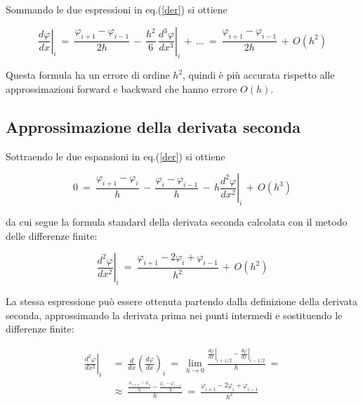 Sommando le due espressioni in eq.(\ref{der}) si ottiene

\[
\left.\frac{d\varphi}{dx}\right|_i
\ =\
\frac{\varphi_{i+1}-\varphi_{i-1}}{2h}\,
-\,
\frac{h^2}{6}\,
\left.\frac{d^3\varphi}{dx^3}\right|_i
\,+\,  \dots\ =\
\frac{\varphi_{i+1}-\varphi_{i-1}}{2h}
\,+\,
O(h^2)
\]

Questa formula ha un errore di ordine $h^2$, quindi è più accurata rispetto alle approssimazioni forward e backward che hanno errore $O(h)$.


\subsection*{Approssimazione della derivata seconda}

Sottraendo le due espansioni in eq.(\ref{der}) si ottiene

\[
0\ =\
\frac{\varphi_{i+1}-\varphi_i}{h}
\,-\,
\frac{\varphi_i-\varphi_{i-1}}{h}
\,-\,
h
\left.\frac{d^2\varphi}{dx^2}\right|_i
\,+\,
O(h^3)
\]

da cui segue la formula standard della derivata seconda calcolata con il metodo delle differenze finite:

\begin{equation}
	\left.\frac{d^2\varphi}{dx^2}\right|_i
	\ =\
	\frac{\varphi_{i+1}-2\varphi_i+\varphi_{i-1}}{h^2}
	\,+\,
	O(h^2)
\end{equation}


La stessa espressione può essere ottenuta partendo dalla definizione della derivata seconda, approssimando la derivata prima nei punti intermedi e sostituendo le differenze finite:

\[ \begin{aligned}
\left.\frac{d^2\varphi}{dx^2}\right|_i
\ &=\
\frac{d}{dx}
\left(
\frac{d\varphi}{dx}
\right)_i
\ =\ 
\lim_{h \to 0}
\frac{
	\left.\frac{d\varphi}{dx}\right|_{i+1/2}
	-
	\left.\frac{d\varphi}{dx}\right|_{i-1/2}
}{h}\ =\\
&\approx \ 
\frac{\frac{\varphi_{i+1}-\varphi_i}{h}-\frac{\varphi_i-\varphi_{i-1}}{h}}{h}
\ =\
\frac{\varphi_{i+1}-2\varphi_i+\varphi_{i-1}}{h^2}
\end{aligned} \]




